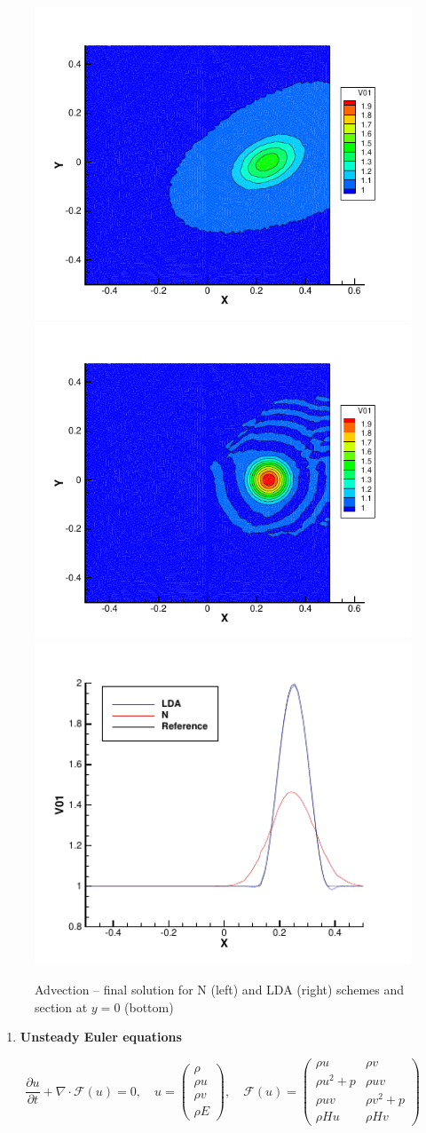 \documentclass[plainboxedsections, 17pt, b1]{sciposter}
\newcommand{\fracpd}[2]{\frac{\partial #1}{\partial #2}}
\begin{document}
\begin{multicols}{3}
\begin{figure}%
	\centering
	\includegraphics[width=0.45\columnwidth]{img/advect_lin_n_map.pdf} 
	\includegraphics[width=0.45\columnwidth]{img/advect_lin_lda_map.pdf} \\
	\includegraphics[width=0.45\columnwidth]{img/advect_lin_section.pdf}%
	\caption{Advection -- final solution for N (left) and LDA (right) schemes and section at $y=0$ (bottom)}%
\end{figure}
		

\begin{enumerate}\addtocounter{enumi}{1}
	\item \textbf{Unsteady Euler equations}
\end{enumerate}
\[ \fracpd{u}{t} + \nabla \cdot \mathcal{F}(u) = 0, \quad u = \left( \begin{array}{c} \rho \\ \rho u \\ \rho v \\ \rho E \end{array} \right), \quad  \mathcal{F} (u) = \left( 
			\begin{array}{cc}	\rho u & \rho v \\ \rho u^2 + p & \rho u v \\ \rho u v & \rho v^2 + p \\ \rho H u & \rho H v \end{array} \right) \]


\end{multicols}
\end{document}
